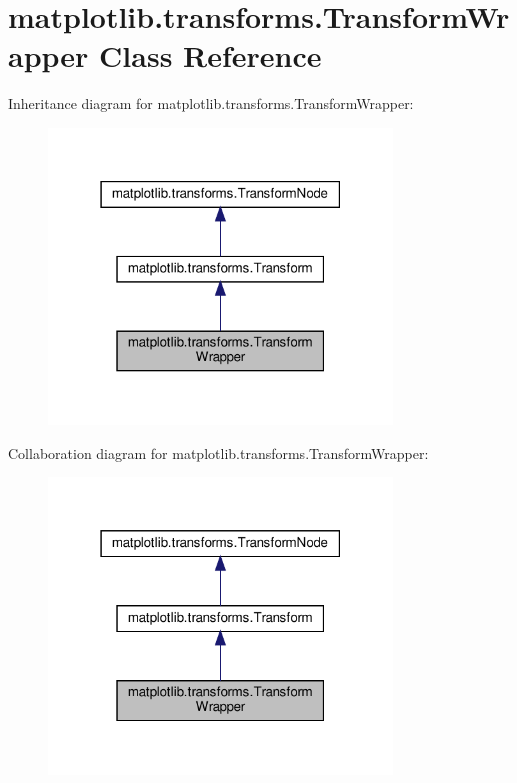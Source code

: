\hypertarget{classmatplotlib_1_1transforms_1_1TransformWrapper}{}\section{matplotlib.\+transforms.\+Transform\+Wrapper Class Reference}
\label{classmatplotlib_1_1transforms_1_1TransformWrapper}


Inheritance diagram for matplotlib.\+transforms.\+Transform\+Wrapper\+:
\nopagebreak
\begin{figure}[H]
\begin{center}
\leavevmode
\includegraphics[width=259pt]{classmatplotlib_1_1transforms_1_1TransformWrapper__inherit__graph}
\end{center}
\end{figure}


Collaboration diagram for matplotlib.\+transforms.\+Transform\+Wrapper\+:
\nopagebreak
\begin{figure}[H]
\begin{center}
\leavevmode
\includegraphics[width=259pt]{classmatplotlib_1_1transforms_1_1TransformWrapper__coll__graph}
\end{center}
\end{figure}
